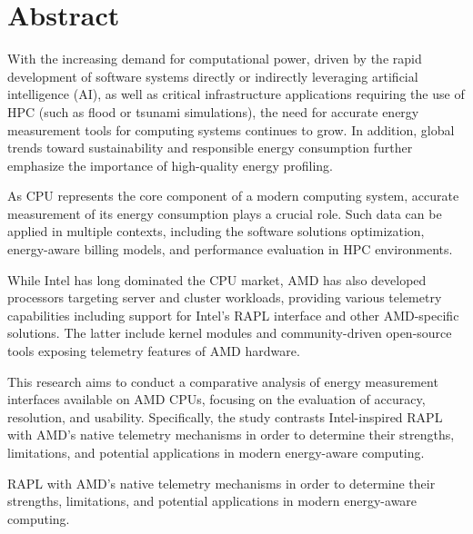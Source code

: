 \section*{Abstract}

With the increasing demand for computational power, driven by the rapid
development of software systems directly or indirectly leveraging
artificial intelligence (AI), as well as critical infrastructure applications
requiring the use of \gls{HPC} (such as flood or tsunami simulations), the
need for accurate energy measurement tools for computing systems continues to
grow. In addition, global trends toward sustainability and responsible energy
consumption further emphasize the importance of high-quality energy profiling.

As \gls{CPU} represents the core component of a modern computing system,
accurate measurement of its energy consumption plays a crucial role.
Such data can be applied in multiple contexts, including the software
solutions optimization, energy-aware billing models, and performance
evaluation in \gls{HPC} environments.

While Intel has long dominated the \gls{CPU} market, AMD has also developed
processors targeting server and cluster workloads, providing various telemetry
capabilities including support for Intel’s \gls{RAPL} interface and other
AMD-specific solutions. The latter include kernel modules and community-driven
open-source tools exposing telemetry features of AMD hardware.

This research aims to conduct a comparative analysis of energy measurement
interfaces available on AMD \gls{CPU}s, focusing on the evaluation of accuracy,
resolution, and usability. Specifically, the study contrasts Intel-inspired
RAPL with AMD’s native telemetry mechanisms in order to determine their strengths,
limitations, and potential applications in modern energy-aware computing.


\gls{RAPL} with AMD’s native telemetry mechanisms in order to determine their
strengths, limitations, and potential applications in modern energy-aware
computing.
